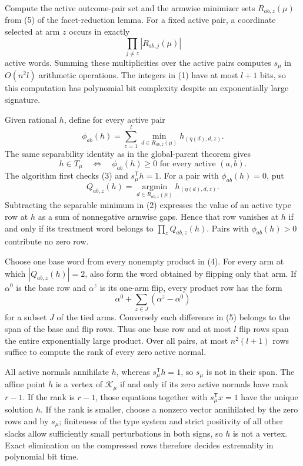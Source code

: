 Compute the active outcome-pair set and the armwise minimizer sets \(R_{ab,z}(\mu)\) from (5) of the facet-reduction lemma. For a fixed active pair, a coordinate selected at arm \(z\) occurs in exactly
\[\prod_{j\ne z}|R_{ab,j}(\mu)|\tag{1}\]
active words. Summing these multiplicities over the active pairs computes \(s_\mu\) in \(O(n^2l)\) arithmetic operations. The integers in (1) have at most \(l+1\) bits, so this computation has polynomial bit complexity despite an exponentially large signature.

Given rational \(h\), define for every active pair
\[\phi_{ab}(h)=\sum_{z=1}^l\min_{d\in R_{ab,z}(\mu)}h_{(\eta(d),d,z)}.\tag{2}\]
The same separability identity as in the global-parent theorem gives
\[h\in T_\mu\quad\Longleftrightarrow\quad \phi_{ab}(h)\ge0\text{ for every active }(a,b).\tag{3}\]
The algorithm first checks (3) and \(s_\mu^{\mathsf T}h=1\). For a pair with \(\phi_{ab}(h)=0\), put
\[Q_{ab,z}(h)=\operatorname*{argmin}_{d\in R_{ab,z}(\mu)}h_{(\eta(d),d,z)}.\tag{4}\]
Subtracting the separable minimum in (2) expresses the value of an active type row at \(h\) as a sum of nonnegative armwise gaps. Hence that row vanishes at \(h\) if and only if its treatment word belongs to \(\prod_zQ_{ab,z}(h)\). Pairs with \(\phi_{ab}(h)>0\) contribute no zero row.

Choose one base word from every nonempty product in (4). For every arm at which \(|Q_{ab,z}(h)|=2\), also form the word obtained by flipping only that arm. If \(\alpha^0\) is the base row and \(\alpha^z\) is its one-arm flip, every product row has the form
\[\alpha^0+\sum_{z\in J}(\alpha^z-\alpha^0)\tag{5}\]
for a subset \(J\) of the tied arms. Conversely each difference in (5) belongs to the span of the base and flip rows. Thus one base row and at most \(l\) flip rows span the entire exponentially large product. Over all pairs, at most \(n^2(l+1)\) rows suffice to compute the rank of every zero active normal.

All active normals annihilate \(h\), whereas \(s_\mu^{\mathsf T}h=1\), so \(s_\mu\) is not in their span. The affine point \(h\) is a vertex of \(\mathcal K_\mu\) if and only if its zero active normals have rank \(r-1\). If the rank is \(r-1\), those equations together with \(s_\mu^{\mathsf T}x=1\) have the unique solution \(h\). If the rank is smaller, choose a nonzero vector annihilated by the zero rows and by \(s_\mu\); finiteness of the type system and strict positivity of all other slacks allow sufficiently small perturbations in both signs, so \(h\) is not a vertex. Exact elimination on the compressed rows therefore decides extremality in polynomial bit time.

